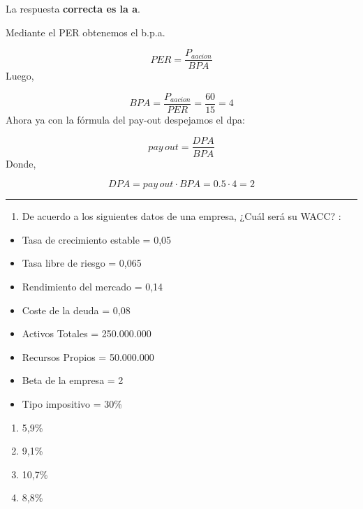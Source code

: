 \documentclass[
  letterpaper,
  DIV=11,
  numbers=noendperiod]{scrreprt}
\providecommand{\tightlist}{%
  \setlength{\itemsep}{0pt}\setlength{\parskip}{0pt}}\usepackage{longtable,booktabs,array}
\begin{document}
\begin{tcolorbox}[enhanced jigsaw, left=2mm, opacityback=0, colback=white, breakable, arc=.35mm, bottomrule=.15mm, rightrule=.15mm, toprule=.15mm, leftrule=.75mm, colframe=quarto-callout-tip-color-frame]
\begin{minipage}[t]{5.5mm}
\textcolor{quarto-callout-tip-color}{\faLightbulb}
\end{minipage}%
\begin{minipage}[t]{\textwidth - 5.5mm}

La respuesta \textbf{correcta es la a}.

Mediante el PER obtenemos el b.p.a.

\[PER=\frac{P_{aacion}}{BPA}\] Luego,

\[ BPA=\frac{P_{aacion}}{PER}=\frac{60}{15}=4\] Ahora ya con la fórmula
del pay-out despejamos el dpa:

\[pay\,out=\frac{DPA}{BPA}\] Donde,

\[DPA=pay\,out\cdot BPA=0.5\cdot4=2\]

\end{minipage}%
\end{tcolorbox}

\begin{center}\rule{0.5\linewidth}{0.5pt}\end{center}

\begin{enumerate}
\def\labelenumi{\arabic{enumi}.}
\setcounter{enumi}{87}
\tightlist
\item
  De acuerdo a los siguientes datos de una empresa, ¿Cuál será su WACC?
  :
\end{enumerate}

\begin{itemize}
\item
  Tasa de crecimiento estable = 0,05
\item
  Tasa libre de riesgo = 0,065
\item
  Rendimiento del mercado = 0,14
\item
  Coste de la deuda = 0,08
\item
  Activos Totales = 250.000.000
\item
  Recursos Propios = 50.000.000
\item
  Beta de la empresa = 2
\item
  Tipo impositivo = 30\%
\end{itemize}

\begin{enumerate}
\def\labelenumi{\alph{enumi})}
\item
  5,9\%
\item
  9,1\%
\item
  10,7\%
\item
  8,8\%
\end{enumerate}
\end{document}

